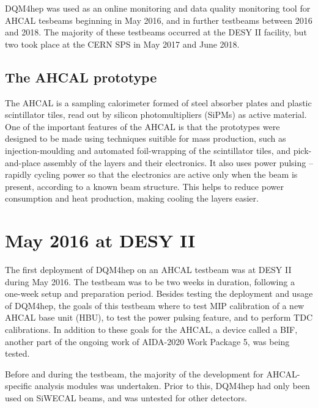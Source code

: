 \acrshort{DQM4hep} was used as an online monitoring and data quality monitoring tool for \acrshort{AHCAL} tesbeams beginning in May 2016, and in further testbeams between 2016 and 2018. The majority of these testbeams occurred at the DESY II facility, but two took place at the \acrshort{CERN} \acrshort{SPS} in May 2017 and June 2018.

\subsection*{The AHCAL prototype} %
The \acrfull{AHCAL} is a sampling calorimeter formed of steel absorber plates and plastic scintillator tiles, read out by silicon photomultipliers (\acrshort{SiPM}s) as active material\cite{proceedings-ahcal-prototype}. One of the important features of the \acrshort{AHCAL} is that the prototypes were designed to be made using techniques suitible for mass production, such as injection-moulding and automated foil-wrapping of the scintillator tiles, and pick-and-place assembly of the layers and their electronics. It also uses power pulsing -- rapidly cycling power so that the electronics are active only when the beam is present, according to a known beam structure. This helps to reduce power consumption and heat production, making cooling the layers easier.

\section{May 2016 at DESY II} %
The first deployment of \acrshort{DQM4hep} on an \acrshort{AHCAL} testbeam was at DESY II during May 2016. The testbeam was to be two weeks in duration, following a one-week setup and preparation period. Besides testing the deployment and usage of DQM4hep, the goals of this testbeam where to test \acrshort{MIP} calibration of a new \acrshort{AHCAL} base unit (HBU), to test the power pulsing feature, and to perform \acrshort{TDC} calibrations. In addition to these goals for the \acrshort{AHCAL}, a device called a \acrfull{BIF}, another part of the ongoing work of AIDA-2020 Work Package 5, was being tested. 

Before and during the testbeam, the majority of the development for AHCAL-specific analysis modules was undertaken. Prior to this, \acrshort{DQM4hep} had only been used on \acrshort{SiWECAL} beams, and was untested for other detectors. 

